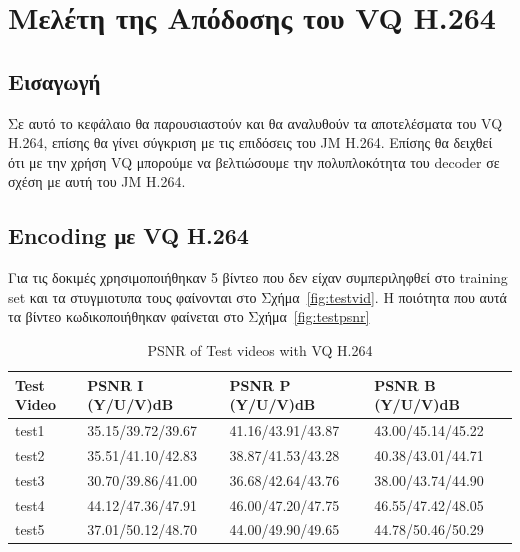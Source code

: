 ﻿\chapter{Μελέτη της Απόδοσης του VQ H.264}
\label{chapter:chap6}

\section{Εισαγωγή}
\label{section:sect61}

\indent Σε αυτό το κεφάλαιο θα παρουσιαστούν και θα αναλυθούν τα αποτελέσματα του VQ H.264, επίσης θα γίνει σύγκριση με τις επιδόσεις του JM H.264. Επίσης θα δειχθεί ότι με την χρήση VQ μπορούμε να βελτιώσουμε την πολυπλοκότητα του decoder σε σχέση με αυτή του JM H.264.

\section{Encoding με VQ H.264}

\indent Για τις δοκιμές χρησιμοποιήθηκαν 5 βίντεο που δεν είχαν συμπεριληφθεί στο training set και τα στυγμιοτυπα τους φαίνονται στο Σχήμα~\ref{fig:testvid}. Η ποιότητα που αυτά τα βίντεο κωδικοποιήθηκαν φαίνεται στο Σχήμα~\ref{fig:testpsnr}

\begin{table}[h!]
    \begin{center}
        \begin{tabular}{| l | l | l | l |}
        \hline
        Test Video & PSNR I (Y/U/V)dB  & PSNR P (Y/U/V)dB  & PSNR B (Y/U/V)dB       \\ \hline
        test1      & 35.15/39.72/39.67 & 41.16/43.91/43.87 & 43.00/45.14/45.22      \\ \hline
        test2      & 35.51/41.10/42.83 & 38.87/41.53/43.28 & 40.38/43.01/44.71      \\ \hline
        test3      & 30.70/39.86/41.00 & 36.68/42.64/43.76 & 38.00/43.74/44.90      \\ \hline
        test4      & 44.12/47.36/47.91 & 46.00/47.20/47.75 & 46.55/47.42/48.05      \\ \hline
        test5      & 37.01/50.12/48.70 & 44.00/49.90/49.65 & 44.78/50.46/50.29      \\ \hline
        \hline
        \end{tabular}
    \end{center}

    \caption{PSNR of Test videos with VQ H.264}
    \label{table:trainingset}
\end{table}

